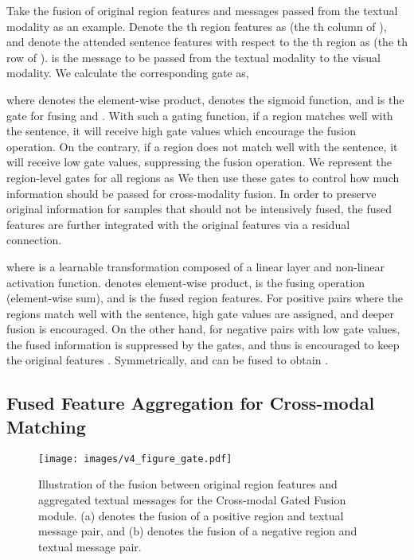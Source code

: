 \documentclass[10pt,twocolumn,letterpaper]{article}
\begin{document}
Take the fusion of original region features  and messages passed from the textual modality  as an example. 
Denote the th region features as  (the th column of ), and denote the attended sentence features with respect to the th region as  (the th row of ).  is the message to be passed from the textual modality to the visual modality. We calculate the corresponding gate as,
{\setlength\abovedisplayskip{8pt}
\setlength\belowdisplayskip{8pt}

}
where  denotes the element-wise product,  denotes the sigmoid function, and  is the gate for fusing  and . 
With such a gating function, if a region matches well with the sentence, it will receive high gate values which encourage the fusion operation. 
On the contrary, if a region does not match well with the sentence, it will receive low gate values, suppressing the fusion operation.
We represent the region-level gates for all regions as 
We then use these gates to control how much information should be passed for cross-modality fusion. 
In order to preserve original information for samples that should not be intensively fused, the fused features are further integrated with the original features via a residual connection.
{{\setlength\abovedisplayskip{8pt}
\setlength\belowdisplayskip{8pt}

}}
where  is a learnable transformation composed of a linear layer and non-linear activation function.  denotes element-wise product,  is the fusing operation (element-wise sum), and  is the fused region features. For positive pairs where the regions match well with the sentence, high gate values are assigned, and deeper fusion is encouraged. On the other hand, for negative pairs with low gate values, the fused information is suppressed by the gates, and thus  is encouraged to keep the original features . Symmetrically,  and  can be fused to obtain .

{\setlength\abovedisplayskip{0pt}
\setlength\belowdisplayskip{0pt}

}



\vspace{-3mm}
\subsection{Fused Feature Aggregation for Cross-modal Matching} 
\label{subsec:fused_agg}






\begin{figure}[t]
\begin{center}
   \texttt{[image: images/v4\_figure\_gate.pdf]}
\end{center}
\vspace{-0.2cm}
   \caption{Illustration of the fusion between original region features and aggregated textual messages for the Cross-modal Gated Fusion module. (a) denotes the fusion of a positive region and textual message pair, and (b) denotes the fusion of a negative region and textual message pair.}
\label{fig:layers}
\vspace{-5mm}
\end{figure}
\end{document}
